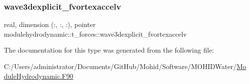 \subsubsection{\texorpdfstring{wave3dexplicit\+\_\+fvortexaccelv}{wave3dexplicit\_fvortexaccelv}}
{\footnotesize\ttfamily real, dimension (\+:, \+:, \+:), pointer modulehydrodynamic\+::t\+\_\+forces\+::wave3dexplicit\+\_\+fvortexaccelv\hspace{0.3cm}{\ttfamily [private]}}



The documentation for this type was generated from the following file\+:\begin{DoxyCompactItemize}
\item 
C\+:/\+Users/administrator/\+Documents/\+Git\+Hub/\+Mohid/\+Software/\+M\+O\+H\+I\+D\+Water/\mbox{\hyperlink{_module_hydrodynamic_8_f90}{Module\+Hydrodynamic.\+F90}}\end{DoxyCompactItemize}
